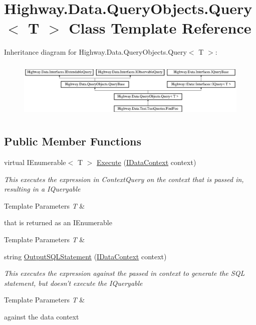 \hypertarget{class_highway_1_1_data_1_1_query_objects_1_1_query-g}{\section{Highway.\-Data.\-Query\-Objects.\-Query$<$ T $>$ Class Template Reference}
\label{class_highway_1_1_data_1_1_query_objects_1_1_query-g}
}
Inheritance diagram for Highway.\-Data.\-Query\-Objects.\-Query$<$ T $>$\-:\begin{figure}[H]
\begin{center}
\leavevmode
\includegraphics[height=2.786070cm]{class_highway_1_1_data_1_1_query_objects_1_1_query-g}
\end{center}
\end{figure}
\subsection*{Public Member Functions}
\begin{DoxyCompactItemize}
\item 
virtual I\-Enumerable$<$ T $>$ \hyperlink{class_highway_1_1_data_1_1_query_objects_1_1_query-g_a68dd6db173a8ea84d10d72ccc27f74f4}{Execute} (\hyperlink{interface_highway_1_1_data_1_1_interfaces_1_1_i_data_context}{I\-Data\-Context} context)
\begin{DoxyCompactList}\small\item\em This executes the expression in Context\-Query on the context that is passed in, resulting in a I\-Queryable
\begin{DoxyTemplParams}{Template Parameters}
{\em T} & \\
\hline
\end{DoxyTemplParams}
that is returned as an I\-Enumerable
\begin{DoxyTemplParams}{Template Parameters}
{\em T} & \\
\hline
\end{DoxyTemplParams}
\end{DoxyCompactList}\item 
string \hyperlink{class_highway_1_1_data_1_1_query_objects_1_1_query-g_a73d9b26cc05e595ea45e5ba03e0812ba}{Output\-S\-Q\-L\-Statement} (\hyperlink{interface_highway_1_1_data_1_1_interfaces_1_1_i_data_context}{I\-Data\-Context} context)
\begin{DoxyCompactList}\small\item\em This executes the expression against the passed in context to generate the S\-Q\-L statement, but doesn't execute the I\-Queryable
\begin{DoxyTemplParams}{Template Parameters}
{\em T} & \\
\hline
\end{DoxyTemplParams}
against the data context \end{DoxyCompactList}\end{DoxyCompactItemize}
